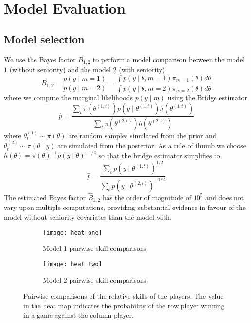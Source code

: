 \section{Model Evaluation}
\subsection{Model selection}
We use the Bayes factor $B_{1, 2}$ to perform a model comparison between the model $1$ (without seniority) and the model $2$ (with seniority)
\begin{equation*}
B_{1, 2}=\frac{p \left(y \mid m=1 \right)}{p \left(y \mid m=2 \right)}=\frac{\int p\left(y \mid \theta, m=1 \right) \pi_{m=1} \left(\theta \right) d \theta}{\int p\left(y \mid \theta, m=2 \right) \pi_{m=2} \left(\theta \right) d \theta}
\end{equation*}
where we compute the marginal likelihoods $p \left(y \mid m \right)$ using the Bridge estimator
\begin{equation*}
\hat{p}=\frac{\sum_{t} \pi\left(\theta^{(1, t)}\right) p\left(y \mid \theta^{(1, t)}\right) h\left(\theta^{(1, t)}\right)}{\sum_{t} \pi\left(\theta^{(2, t)}\right) h\left(\theta^{(2, t)}\right)}
\end{equation*}
where $\theta_{t}^{(1)} \sim \pi(\theta)$ are random samples simulated from the prior and $\theta_{t}^{(2)} \sim \pi(\theta \mid y)$ are simulated from the posterior. As a rule of thumb we choose $h(\theta)=\pi(\theta)^{-1} p \left(y \mid \theta \right)^{-1 / 2}$ so that the bridge estimator simplifies to
\begin{equation*}
\hat{p}=\frac{\sum_{t} p\left(y \mid \theta^{(1, t)}\right)^{1 / 2}}{\sum_{t} p\left(y \mid \theta^{(2, t)}\right)^{-1 / 2}}
\end{equation*}
The estimated Bayes factor $\hat{B}_{1, 2}$ has the order of magnitude of $10^{5}$ and does not vary upon multiple computations, providing substantial evidence in favour of the model without seniority covariates than the model with.

\begin{figure}[ht!] \centering
\begin{subfigure}[b]{0.45\textwidth} \centering
   \texttt{[image: heat\_one]}
   \caption{Model 1 pairwise skill comparisons} \label{fig:6a}
\end{subfigure}
\begin{subfigure}[b]{0.45\textwidth} \centering
   \texttt{[image: heat\_two]}
   \caption{Model 2 pairwise skill comparisons} \label{fig:6b}
\end{subfigure} \hspace{1em}
\caption{Pairwise comparisons of the relative skills of the players. The value in the heat map indicates the probability of the row player winning in a game against the column player.}
\label{fig:6}
\end{figure}

